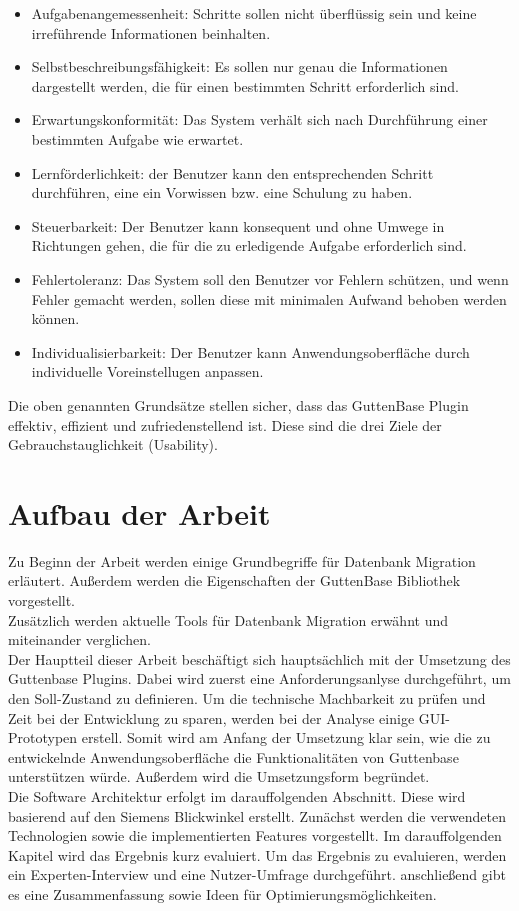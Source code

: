 \begin{itemize}
	\item Aufgabenangemessenheit:
	Schritte sollen nicht überflüssig sein und keine irreführende Informationen beinhalten.
	
	\item Selbstbeschreibungsfähigkeit:
	Es sollen nur genau die Informationen dargestellt werden, die für einen bestimmten Schritt erforderlich sind.
	
	\item Erwartungskonformität:
	Das System verhält sich nach Durchführung einer bestimmten Aufgabe wie erwartet.
	
	\item Lernförderlichkeit:
	der Benutzer kann den entsprechenden Schritt durchführen, eine ein Vorwissen bzw. eine Schulung zu haben.
	
	\item Steuerbarkeit:
	Der Benutzer kann konsequent und ohne Umwege in Richtungen gehen, die für die zu erledigende Aufgabe erforderlich sind.
	
	\item Fehlertoleranz:
	Das System soll den Benutzer vor Fehlern schützen, und wenn Fehler gemacht werden, sollen diese mit minimalen Aufwand behoben werden können.

	\item Individualisierbarkeit:
	Der Benutzer kann Anwendungsoberfläche durch individuelle Voreinstellugen anpassen.
	
\end{itemize}
Die oben genannten Grundsätze stellen sicher, dass das GuttenBase Plugin effektiv, effizient und zufriedenstellend ist. Diese sind die drei Ziele der Gebrauchstauglichkeit (Usability).

\section{Aufbau der Arbeit}
Zu Beginn der Arbeit werden einige Grundbegriffe für Datenbank Migration erläutert. Außerdem werden die Eigenschaften der GuttenBase Bibliothek vorgestellt.\\
Zusätzlich werden aktuelle Tools für Datenbank Migration erwähnt und miteinander verglichen.\\
Der Hauptteil dieser Arbeit beschäftigt sich hauptsächlich mit der Umsetzung des Guttenbase Plugins. Dabei wird zuerst eine Anforderungsanlyse durchgeführt, um den Soll-Zustand zu definieren. Um die technische Machbarkeit zu prüfen und Zeit bei der Entwicklung zu sparen, werden bei der Analyse einige GUI-Prototypen erstell. Somit wird am Anfang der Umsetzung klar sein, wie die zu entwickelnde Anwendungsoberfläche die Funktionalitäten von Guttenbase unterstützen würde. Außerdem wird die Umsetzungsform begründet. \\
Die Software Architektur erfolgt im darauffolgenden Abschnitt. Diese wird basierend auf den Siemens Blickwinkel erstellt. Zunächst werden die verwendeten Technologien sowie die implementierten Features vorgestellt.
Im darauffolgenden Kapitel wird das Ergebnis kurz evaluiert.
Um das Ergebnis zu evaluieren, werden ein Experten-Interview und eine Nutzer-Umfrage durchgeführt.
anschließend gibt es eine Zusammenfassung sowie Ideen für Optimierungsmöglichkeiten.